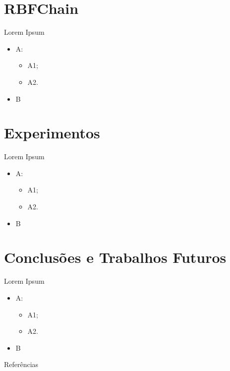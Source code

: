 \documentclass[10pt]{beamer}
\begin{document}
\section{RBFChain}

\begin{frame}{Lorem Ipsum}
    \begin{itemize}
        \item<1 -> A:
        \begin{itemize}
            \item<2 -> A1;
            \item<2 -> A2.
        \end{itemize}
        \item<3 -> B
      \end{itemize}
\end{frame}

\section{Experimentos}

\begin{frame}{Lorem Ipsum}
    \begin{itemize}
        \item<1 -> A:
        \begin{itemize}
            \item<2 -> A1;
            \item<2 -> A2.
        \end{itemize}
        \item<3 -> B
      \end{itemize}
\end{frame}

\section{Conclusões e Trabalhos Futuros}

\begin{frame}{Lorem Ipsum}
    \begin{itemize}
        \item<1 -> A:
        \begin{itemize}
            \item<2 -> A1;
            \item<2 -> A2.
        \end{itemize}
        \item<3 -> B
      \end{itemize}
\end{frame}

\begin{frame}[allowframebreaks]{Referências}

  
  

\end{frame}
\end{document}
